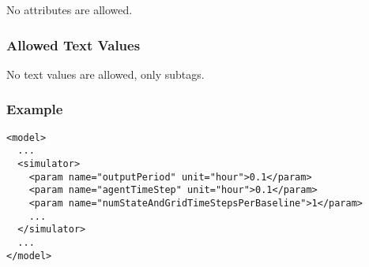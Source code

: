 No attributes are allowed.

\subsubsection{Allowed Text Values}

No text values are allowed, only subtags.

\subsubsection{Example}

\begin{verbatim}
<model>
  ...  
  <simulator>
    <param name="outputPeriod" unit="hour">0.1</param>
    <param name="agentTimeStep" unit="hour">0.1</param>
    <param name="numStateAndGridTimeStepsPerBaseline">1</param>
    ...  
  </simulator>
  ...  
</model>
\end{verbatim}

